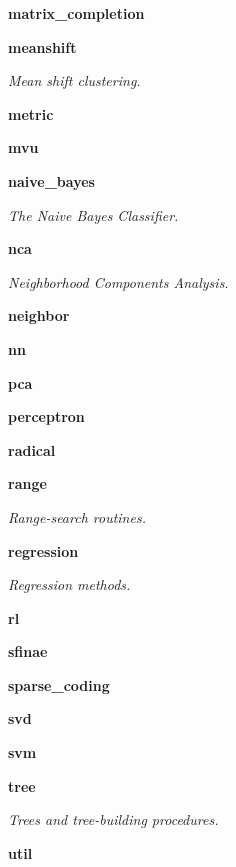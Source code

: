 \begin{DoxyCompactItemize}
 \textbf{ matrix\+\_\+completion}
\item 
 \textbf{ meanshift}
\begin{DoxyCompactList}\small\item\em Mean shift clustering. \end{DoxyCompactList}\item 
 \textbf{ metric}
\item 
 \textbf{ mvu}
\item 
 \textbf{ naive\+\_\+bayes}
\begin{DoxyCompactList}\small\item\em The Naive Bayes Classifier. \end{DoxyCompactList}\item 
 \textbf{ nca}
\begin{DoxyCompactList}\small\item\em Neighborhood Components Analysis. \end{DoxyCompactList}\item 
 \textbf{ neighbor}
\item 
 \textbf{ nn}
\item 
 \textbf{ pca}
\item 
 \textbf{ perceptron}
\item 
 \textbf{ radical}
\item 
 \textbf{ range}
\begin{DoxyCompactList}\small\item\em Range-\/search routines. \end{DoxyCompactList}\item 
 \textbf{ regression}
\begin{DoxyCompactList}\small\item\em Regression methods. \end{DoxyCompactList}\item 
 \textbf{ rl}
\item 
 \textbf{ sfinae}
\item 
 \textbf{ sparse\+\_\+coding}
\item 
 \textbf{ svd}
\item 
 \textbf{ svm}
\item 
 \textbf{ tree}
\begin{DoxyCompactList}\small\item\em Trees and tree-\/building procedures. \end{DoxyCompactList}\item 
 \textbf{ util}
\end{DoxyCompactItemize}
